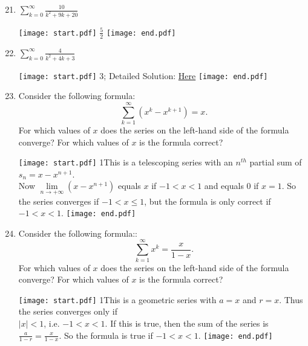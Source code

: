 \documentclass[12pt]{article}
\begin{document}
\begin{enumerate}
\setcounter{enumi}{20}

\item $\sum_{k=0}^{\infty}\frac{10}{k^2+9k+20}$

\texttt{[image: start.pdf]}
{{$\frac{5}{2}$}}
\texttt{[image: end.pdf]}

 
\item $\sum_{k=0}^{\infty}\frac{4}{k^2+4k+3}$

\texttt{[image: start.pdf]}
{{$3$; Detailed Solution: \textcolor{blue}{\href{http://www.math.drexel.edu/classes/Calculus/resources/Math123HW/Solutions/123_07_Series_22.pdf}{Here}}}}
\texttt{[image: end.pdf]}


\item Consider the following formula: $$\sum_{k=1}^{\infty} (x^{k}-x^{k+1})=x.$$ For which values of $x$ does 
the series on the left-hand side of the formula converge?  For which values of $x$ is the formula correct?

\texttt{[image: start.pdf]}
{{{1\linewidth}{This is a telescoping series with an $n^{\mathit{th}}$ partial sum of $s_n=x-x^{n+1}$.  
\\ Now  $\textstyle \lim\limits_{n \rightarrow +\infty}\left(x-x^{n+1}\right)$ equals $x$ if
$-1<x<1$ and equals $0$ if $x=1$.  So the series converges if $-1<x\leq1$, but the formula is only correct if $-1<x<1$. }}}
\texttt{[image: end.pdf]}


\item Consider the following formula:: $$\sum_{k=1}^{\infty}x^{k}=\frac{x}{1-x}.$$  For which values of $x$ does
the series on the left-hand side of the formula converge?  For which values of $x$ is the formula correct?

\texttt{[image: start.pdf]}
{{{1\linewidth}{This is a geometric series with $a=x$ and $r=x$.  Thus the series converges only if \\  $|x|<1$, i.e. $-1<x<1$.  If this is true, then the sum of the series is
$\textstyle \frac{a}{1-r}=\frac{x}{1-x}$.  So the formula is true if $-1<x<1$.  }}}
\texttt{[image: end.pdf]}


\end{enumerate}
\end{document}
